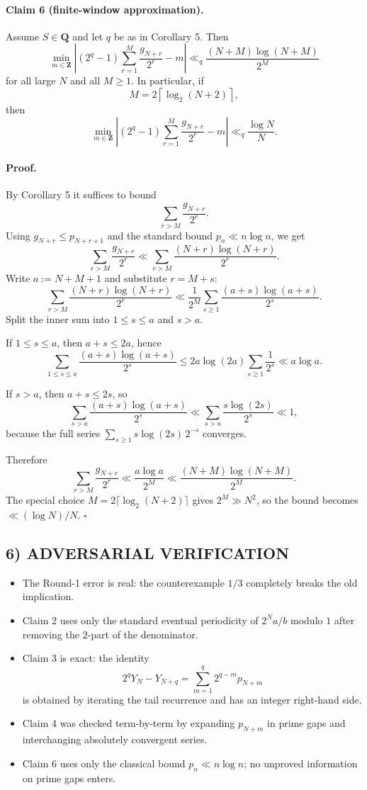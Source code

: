 \paragraph{Claim 6 (finite-window approximation).}
Assume $S\in\mathbf{Q}$ and let $q$ be as in Corollary 5. Then
\[
\min_{m\in\mathbf{Z}}
\left|
(2^q-1)\sum_{r=1}^{M}\frac{g_{N+r}}{2^r}-m
\right|
\ll_q \frac{(N+M)\log(N+M)}{2^M}
\]
for all large $N$ and all $M\ge 1$. In particular, if
\[
M=2\left\lceil \log_2(N+2)\right\rceil,
\]
then
\[
\min_{m\in\mathbf{Z}}
\left|
(2^q-1)\sum_{r=1}^{M}\frac{g_{N+r}}{2^r}-m
\right|
\ll_q \frac{\log N}{N}.
\]

\paragraph{Proof.}
By Corollary 5 it suffices to bound
\[
\sum_{r>M}\frac{g_{N+r}}{2^r}.
\]
Using $g_{N+r}\le p_{N+r+1}$ and the standard bound $p_n\ll n\log n$, we get
\[
\sum_{r>M}\frac{g_{N+r}}{2^r}
\ll \sum_{r>M}\frac{(N+r)\log(N+r)}{2^r}.
\]
Write $a:=N+M+1$ and substitute $r=M+s$:
\[
\sum_{r>M}\frac{(N+r)\log(N+r)}{2^r}
\ll \frac1{2^M}\sum_{s\ge 1}\frac{(a+s)\log(a+s)}{2^s}.
\]
Split the inner sum into $1\le s\le a$ and $s>a$.

If $1\le s\le a$, then $a+s\le 2a$, hence
\[
\sum_{1\le s\le a}\frac{(a+s)\log(a+s)}{2^s}
\le 2a\log(2a)\sum_{s\ge 1}\frac1{2^s}
\ll a\log a.
\]

If $s>a$, then $a+s\le 2s$, so
\[
\sum_{s>a}\frac{(a+s)\log(a+s)}{2^s}
\ll \sum_{s>a}\frac{s\log(2s)}{2^s}
\ll 1,
\]
because the full series $\sum_{s\ge 1} s\log(2s)\,2^{-s}$ converges.

Therefore
\[
\sum_{r>M}\frac{g_{N+r}}{2^r}
\ll \frac{a\log a}{2^M}
\ll \frac{(N+M)\log(N+M)}{2^M}.
\]
The special choice $M=2\lceil\log_2(N+2)\rceil$ gives $2^M\gg N^2$, so the bound becomes $\ll (\log N)/N$.
\hfill$\square$

\subsection*{6) ADVERSARIAL VERIFICATION}

\begin{itemize}
\item The Round-1 error is real: the counterexample $1/3$ completely breaks the old implication.
\item Claim 2 uses only the standard eventual periodicity of $2^N a/b$ modulo $1$ after removing the $2$-part of the denominator.
\item Claim 3 is exact: the identity
\[
2^qY_N-Y_{N+q}=\sum_{m=1}^{q}2^{q-m}p_{N+m}
\]
is obtained by iterating the tail recurrence and has an integer right-hand side.
\item Claim 4 was checked term-by-term by expanding $p_{N+m}$ in prime gaps and interchanging absolutely convergent series.
\item Claim 6 uses only the classical bound $p_n\ll n\log n$; no unproved information on prime gaps enters.
\end{itemize}

